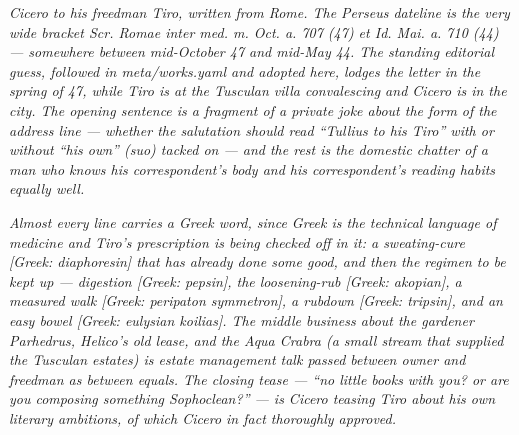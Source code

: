 
\textit{Cicero to his freedman Tiro, written from Rome. The
Perseus dateline is the very wide bracket \textit{Scr. Romae
inter med. m. Oct. a. 707 (47) et Id. Mai. a. 710 (44)} ---
somewhere between mid-October 47 and mid-May 44. The standing
editorial guess, followed in \textit{meta/works.yaml} and
adopted here, lodges the letter in the spring of 47, while
Tiro is at the Tusculan villa convalescing and Cicero is in
the city. The opening sentence is a fragment of a private
joke about the form of the address line --- whether the
salutation should read ``Tullius to his Tiro'' with or without
``his own'' (\textit{suo}) tacked on --- and the rest is the
domestic chatter of a man who knows his correspondent's body
and his correspondent's reading habits equally well.}

\textit{Almost every line carries a Greek word, since Greek
is the technical language of medicine and Tiro's prescription
is being checked off in it: a sweating-cure
\textit{[Greek: diaphoresin]} that has already done some good,
and then the regimen to be kept up --- digestion
\textit{[Greek: pepsin]}, the loosening-rub
\textit{[Greek: akopian]}, a measured walk
\textit{[Greek: peripaton symmetron]}, a rubdown
\textit{[Greek: tripsin]}, and an easy bowel
\textit{[Greek: eulysian koilias]}. The middle business about
the gardener Parhedrus, Helico's old lease, and the
Aqua Crabra (a small stream that supplied the Tusculan
estates) is estate management talk passed between owner and
freedman as between equals. The closing tease ---
``no little books with you? or are you composing something
Sophoclean?'' --- is Cicero teasing Tiro about his own
literary ambitions, of which Cicero in fact thoroughly
approved.}
